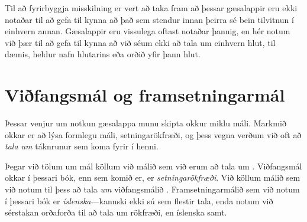 Til að fyrirbyggja misskilning er vert að taka fram að þessar gæsalappir eru ekki notaðar til að gefa til kynna að það sem stendur innan þeirra sé bein tilvitnun í einhvern annan. Gæsalappir eru vissulega oftast notaðar þannig, en hér notum við þær til að gefa til kynna að við séum ekki að tala um einhvern hlut, til dæmis, heldur nafn hlutarins eða orðið yfir þann hlut.

\section{Viðfangsmál og framsetningarmál}

Þessar venjur um notkun gæsalappa munu skipta okkur miklu máli. Markmið okkar er að lýsa formlegu máli, setningarökfræði, og þess vegna verðum við oft að \emph{tala um} táknrunur sem koma fyrir í henni.

Þegar við tölum um mál köllum við málið sem við erum að tala um . Viðfangsmál okkar í þessari bók, enn sem komið er, er \emph{setningarökfræði}. Við köllum málið sem við notum til þess að tala \emph{um} viðfangsmálið . Framsetningarmálið sem við notum í þessari bók er \emph{íslenska}---kannski ekki sú sem flestir tala, enda notum við sérstakan orðaforða til að tala um rökfræði, en íslenska samt. \label{def.metalanguage}

